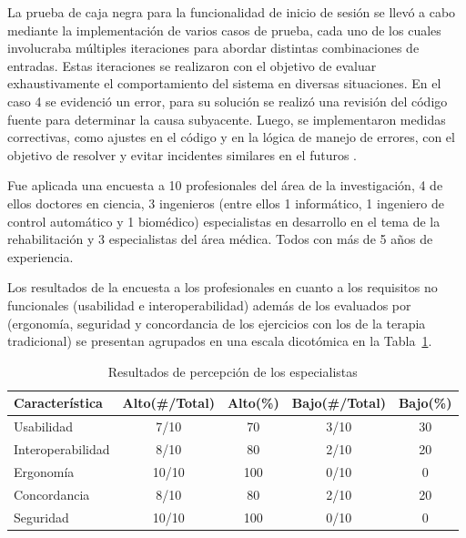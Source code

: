 La prueba de caja negra para la funcionalidad de inicio de sesión se llevó a cabo mediante la implementación de varios casos de prueba, cada uno de los cuales involucraba múltiples iteraciones para abordar distintas combinaciones de entradas. Estas iteraciones se realizaron con el objetivo de evaluar exhaustivamente el comportamiento del sistema en diversas situaciones. En el caso 4 se evidenció un error, para su solución se realizó una revisión del código fuente para determinar la causa subyacente. Luego, se implementaron medidas correctivas, como ajustes en el código y en la lógica de manejo de errores, con el objetivo de resolver y evitar incidentes similares en el futuros .

Fue aplicada una encuesta a 10 profesionales del área de la investigación, 4 de ellos doctores en ciencia, 3 ingenieros (entre ellos 1 informático, 1 ingeniero de control automático y 1 biomédico) especialistas en desarrollo en el tema de la rehabilitación y 3 especialistas del área médica. Todos con más de 5 años de experiencia.

Los resultados de la encuesta a los profesionales en cuanto a los requisitos no funcionales (usabilidad e interoperabilidad) además de los evaluados por \cite{franco2016sistema} (ergonomía, seguridad y concordancia de los ejercicios con los de la terapia tradicional) se presentan agrupados en una escala dicotómica en la Tabla~\ref{table:test}.

\begin{table}[ht]
    \centering
    \begin{tabular}{p{3cm} c c c c}
        \hline
        Característica      &  Alto(\#/Total)   &  Alto(\%) & Bajo(\#/Total)  & Bajo(\%) \\\hline
        Usabilidad          &  7/10   &  70   & 3/10  &   30\\
        Interoperabilidad   &  8/10   &  80   & 2/10  &   20\\
        Ergonomía           &  10/10  &  100  & 0/10  &   0\\
        Concordancia        &  8/10   &  80   & 2/10  &   20\\
        Seguridad           &  10/10  &  100  & 0/10  &   0\\
        \hline        
    \end{tabular}        
    \caption{Resultados de percepción de los especialistas}
    \label{table:test}
\end{table}

